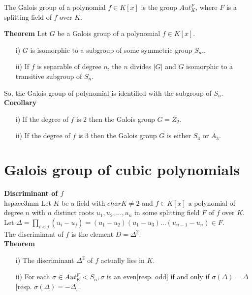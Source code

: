 The Galois group of a polynomial \(f \in K[x]\) is the group \(Aut_K^F\), where \(F\) is a splitting field of \(f\) over \(K\).

\textbf{Theorem} \hspace{3mm} Let \(G\) be a Galois group of a polynomial \(f \in K[x]\).
\begin{enumerate}
\item[i)] \(G\) is isomorphic to a subgroup of some symmetric group \(S_n\)..
  \item[ii)] If \(f\) is separable of degree \(n\), the \(n\) divides \(|G|\) and \(G\) isomorphic to a transitive subgroup of \(S_n\).
\end{enumerate}


So, the Galois group of polynomial is identified with the subgroup of \(S_n\).\\[2mm]

\textbf{Corollary}
\begin{enumerate}
\item[i)] If the degree of \(f\) is \(2\) then the Galois group \(G=Z_2\).
  \item[ii)] If the degree of \(f\) is \(3\) then the Galois group \(G\) is either \(S_3\) or \(A_3\).
\end{enumerate}

\section{Galois group of cubic polynomials}
\textbf{Discriminant of \(f\)} \\hspace{3mm} Let \(K\) be a field with \(char K \neq 2\) and \(f \in K[x]\) a polynomial of degree \(n\) with \(n\) distinct roots \(u_1,u_2,...,u_n\) in some splitting field \(F\) of \(f\) over \(K\). Let \(\Delta = \prod\limits_{i<j}(u_i-u_j) = (u_1-u_2)(u_1-u_3)...(u_{n-1}-u_n) \in F\).\\

The discriminant of \(f\) is the element \(D= {\Delta}^2\).\\[2mm]


\textbf{Theorem}
\begin{enumerate}
\item[i)] The discriminant \({\Delta}^2\) of \(f\) actually lies in \(K\).
  \item[ii)] For each \(\sigma \in Aut_K^F < S_n, \sigma\) is an even[resp. odd] if and only if \(\sigma(\Delta) = \Delta\)[resp. \(\sigma(\Delta) = - \Delta\)].
\end{enumerate}

